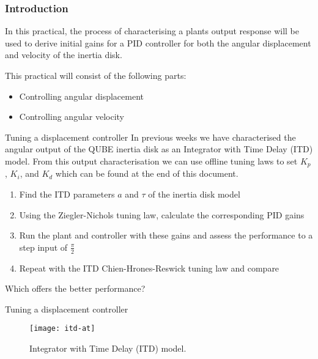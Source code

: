 \documentclass[9pt]{beamer-control}
\begin{document}

\begin{frame}
\frametitle{Introduction}
In this practical, the process of characterising a plants output response will be used to derive initial gains for a PID controller for both the angular displacement and velocity of the inertia disk.

\vfill

This practical will consist of the following parts:
\begin{itemize}
\item Controlling angular displacement
\item Controlling angular velocity
\end{itemize}
\end{frame}




\begin{frame}{Tuning a displacement controller}
In previous weeks we have characterised the angular output of the QUBE inertia disk as an Integrator with Time Delay (ITD) model. From this output characterisation we can use offline tuning laws to set $K_p$, $K_i$, and $K_d$ which can be found at the end of this document.

\begin{enumerate}
\item Find the ITD parameters $a$ and $\tau$ of the inertia disk model 
\item Using the Ziegler-Nichols tuning law, calculate the corresponding PID gains
\item Run the plant and controller with these gains and assess the performance to a step input of $\tfrac{\pi}{2}$
\item Repeat with the ITD Chien-Hrones-Reswick tuning law and compare
\end{enumerate}

Which offers the better performance?


\end{frame}


\begin{frame}{Tuning a displacement controller}
	\begin{figure}
		\centering
		\texttt{[image: itd-at]}
		\caption{Integrator with Time Delay (ITD) model.}
	\end{figure}
\end{frame}
\end{document}
